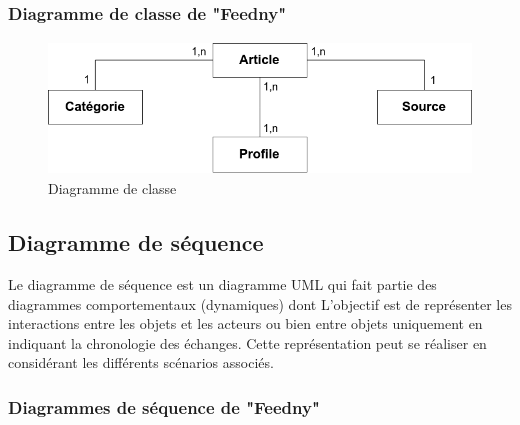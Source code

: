 \subsubsection{Diagramme de classe de "Feedny"}
\begin{figure}[H]
    \centering
    \includegraphics[height=100pt,width=320pt]{img/chapter3/classdiagram.png}
    \caption{Diagramme de classe}
\end{figure}

\subsection{Diagramme de séquence}
Le diagramme de séquence est un diagramme UML qui fait partie des diagrammes comportementaux (dynamiques) dont L'objectif est de représenter les interactions entre les objets et les acteurs ou bien entre objets uniquement  en indiquant la chronologie des échanges. Cette représentation peut se réaliser en considérant les différents scénarios associés.\cite{UML}


\subsubsection{Diagrammes de séquence de "Feedny"}


